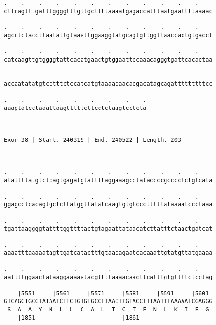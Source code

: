 \documentclass{article}
\begin{document}
\begin{Verbatim}
.    .    .    .    .    .    .    .    .    .    .    .    
cttcagtttgatttggggtttgttgcttttaaaatgagaccatttaatgaattttaaaac
                                                            
.    .    .    .    .    .    .    .    .    .    .    .    
agcctctaccttaatattgtaaattggaaggtatgcagtgttggttaaccactgtgacct
                                                            
.    .    .    .    .    .    .    .    .    .    .    .    
catcaagttgtggggtattcacatgaactgtggaattccaaacagggtgattcacactaa
                                                            
.    .    .    .    .    .    .    .    .    .    .    .    
accaatatatgtcctttctccatcatgtaaaacaacacgacatagcagatttttttttcc
                                                            
.    .    .    .    .    .    .    .    .
aaagtatcctaaattaagtttttcttcctctaagtcctcta
                                         
                                         
 
Exon 38 | Start: 240319 | End: 240522 | Length: 203



.    .    .    .    .    .    .    .    .    .    .    .    
atattttatgtctcagtgagatgtattttaggaaagcctataccccgcccctctgtcata
                                                            
.    .    .    .    .    .    .    .    .    .    .    .    
ggagcctcacagtgctcttatggttatatcaagtgtgtccctttttataaaatccctaaa
                                                            
.    .    .    .    .    .    .    .    .    .    .    .    
tgattaaggggtattttggttttactgtagaattataacatcttatttctaactgatcat
                                                            
.    .    .    .    .    .    .    .    .    .    .    .    
aaaatttaaaaatagttgatcatactttgtaacagaatcacaaattgtatgttatgaaaa
                                                            
.    .    .    .    .    .    .    .    .    .    .    .    
aattttggaactataaggaaaaatacgttttaaaacaacttcatttgtgttttctcctag
                                                            
    |5551     |5561     |5571     |5581     |5591     |5601 
GTCAGCTGCCTATAATCTTCTGTGTGCCTTAACTTGTACCTTTAATTTAAAAATCGAGGG
 S  A  A  Y  N  L  L  C  A  L  T  C  T  F  N  L  K  I  E  G 
    |1851                         |1861                     
  

\end{Verbatim}
\end{document}
